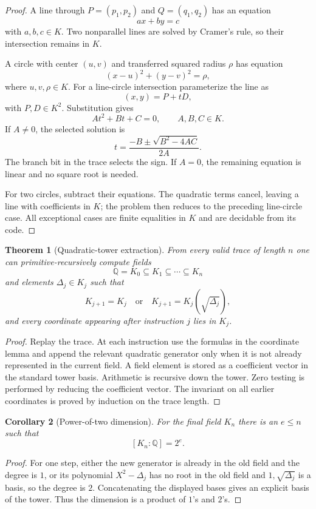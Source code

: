 \documentclass[11pt]{article}
\newtheorem{theorem}{Theorem}[section]
\newtheorem{corollary}[theorem]{Corollary}
\newcommand{\Q}{\mathbb{Q}}
\begin{document}
\begin{proof}
A line through $P=(p_1,p_2)$ and $Q=(q_1,q_2)$ has an equation
\[
  a x+b y=c
\]
with $a,b,c\in K$.  Two nonparallel lines are solved by Cramer's rule, so their intersection remains in $K$.

A circle with center $(u,v)$ and transferred squared radius $\rho$ has equation
\[
  (x-u)^2+(y-v)^2=\rho,
\]
where $u,v,\rho\in K$.  For a line-circle intersection parameterize the line as
\[
  (x,y)=P+tD,
\]
with $P,D\in K^2$.  Substitution gives
\[
  A t^2+B t+C=0,\qquad A,B,C\in K.
\]
If $A\ne0$, the selected solution is
\[
  t=\frac{-B\pm\sqrt{B^2-4AC}}{2A}.
\]
The branch bit in the trace selects the sign.  If $A=0$, the remaining equation is linear and no square root is needed.

For two circles, subtract their equations.  The quadratic terms cancel, leaving a line with coefficients in $K$; the problem then reduces to the preceding line-circle case.  All exceptional cases are finite equalities in $K$ and are decidable from its code.
\end{proof}

\begin{theorem}[Quadratic-tower extraction]
From every valid trace of length $n$ one can primitive-recursively compute fields
\[
  \Q=K_0\subseteq K_1\subseteq\cdots\subseteq K_n
\]
and elements $\Delta_j\in K_j$ such that
\[
  K_{j+1}=K_j\quad\text{or}\quad K_{j+1}=K_j(\sqrt{\Delta_j}),
\]
and every coordinate appearing after instruction $j$ lies in $K_j$.
\end{theorem}

\begin{proof}
Replay the trace.  At each instruction use the formulas in the coordinate lemma and append the relevant quadratic generator only when it is not already represented in the current field.  A field element is stored as a coefficient vector in the standard tower basis.  Arithmetic is recursive down the tower.  Zero testing is performed by reducing the coefficient vector.  The invariant on all earlier coordinates is proved by induction on the trace length.
\end{proof}

\begin{corollary}[Power-of-two dimension]
For the final field $K_n$ there is an $e\le n$ such that
\[
  [K_n:\Q]=2^e.
\]
\end{corollary}

\begin{proof}
For one step, either the new generator is already in the old field and the degree is $1$, or its polynomial $X^2-\Delta_j$ has no root in the old field and $1,\sqrt{\Delta_j}$ is a basis, so the degree is $2$.  Concatenating the displayed bases gives an explicit basis of the tower.  Thus the dimension is a product of $1$'s and $2$'s.
\end{proof}
\end{document}
